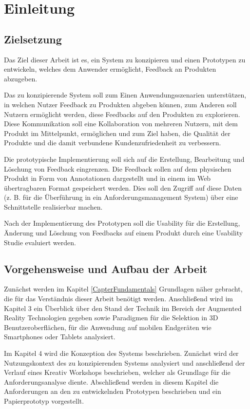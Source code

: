 \chapter{Einleitung}

\section{Zielsetzung}

Das Ziel dieser Arbeit ist es, ein System zu konzipieren und einen Prototypen zu entwickeln, welches dem Anwender ermöglicht, Feedback an Produkten
abzugeben. 

Das zu konzipierende System soll zum Einen Anwendungsszenarien unterstützen, in welchen Nutzer Feedback zu Produkten abgeben können, 
zum Anderen soll Nutzern ermöglicht werden, diese Feedbacks auf den Produkten zu explorieren. 
Diese Kommunikation soll eine Kollaboration von mehreren Nutzern, mit dem Produkt im Mittelpunkt, ermöglichen und zum Ziel haben, die Qualität der 
Produkte und die damit verbundene Kundenzufriedenheit zu verbessern.

Die prototypische Implementierung soll sich auf die Erstellung, Bearbeitung und Löschung von Feedback eingrenzen. Die Feedback sollen auf dem physischen 
Produkt in Form von Annotationen dargestellt und in einem im Web übertragbaren Format gespeichert werden. Dies soll den Zugriff auf diese Daten 
(z. B. für die Überführung in ein Anforderungsmanagement System) über eine Schnittstelle realisierbar machen.  

Nach der Implementierung des Prototypen soll die Usability für die Erstellung, Änderung und Löschung von Feedbacks auf einem Produkt durch 
eine Usability Studie evaluiert werden. 

\section{Vorgehensweise und Aufbau der Arbeit}

Zunächst werden im Kapitel \ref{CapterFundamentals} Grundlagen näher gebracht, die für das Verständnis dieser Arbeit benötigt werden. Anschließend wird 
im Kapitel 3 ein Überblick über den Stand der Technik im Bereich der Augmented Reality Technologien gegeben sowie Paradigmen für die Selektion in 3D Benutzeroberflächen, 
für die Anwendung auf mobilen Endgeräten wie Smartphones oder Tablets analysiert.  
 
Im Kapitel 4 wird die Konzeption des Systems beschrieben. Zunächst wird der Nutzungskontext des zu konzipierenden Systems analysiert und 
anschließend der Verlauf eines Kreativ Workshops beschrieben, welcher als Grundlage für die Anforderungsanalyse diente. Abschließend werden in diesem Kapitel 
die Anforderungen an den zu entwickelnden Prototypen beschrieben und ein Papierprototyp vorgestellt. 

